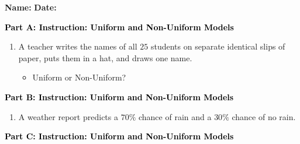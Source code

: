 \documentclass[12pt, letterpaper, fleqn]{article}
\newcommand{\blank}{\underline{\hspace{2.2cm}}}
\newcommand{\blanklong}{\underline{\hspace{6.5cm}}}
\begin{document}
\textbf{Name:} \underline{\hspace{5cm}}
\hfill
\textbf{Date:} \underline{\hspace{3cm}}\\

\begin{tcolorbox}[colback=customteal!20]
\large\textcolor{black}{\textbf{Part A: Instruction: Uniform and Non-Uniform Models}}
\end{tcolorbox}

\vspace{3mm}

\begin{enumerate}[itemsep=2.2cm, leftmargin=0.6cm]
\item A teacher writes the names of all $25$ students on separate identical slips of paper, puts them in a hat, and draws one name.
\begin{itemize}
\item Uniform or Non-Uniform? \blank
\end{itemize}
\end{enumerate}

\newpage

\begin{tcolorbox}[colback=customteal!20]
\large\textcolor{black}{\textbf{Part B: Instruction: Uniform and Non-Uniform Models}}
\end{tcolorbox}

\vspace{3mm}

\begin{enumerate}[itemsep=2.2cm, leftmargin=0.6cm, resume]
\begin{itemize}
\item Why? \blanklong
\end{itemize}
\item A weather report predicts a $70\%$ chance of rain and a $30\%$ chance of no rain.
\end{enumerate}

\newpage

\begin{tcolorbox}[colback=customteal!20]
\large\textcolor{black}{\textbf{Part C: Instruction: Uniform and Non-Uniform Models}}
\end{tcolorbox}

\vspace{3mm}
\end{document}
